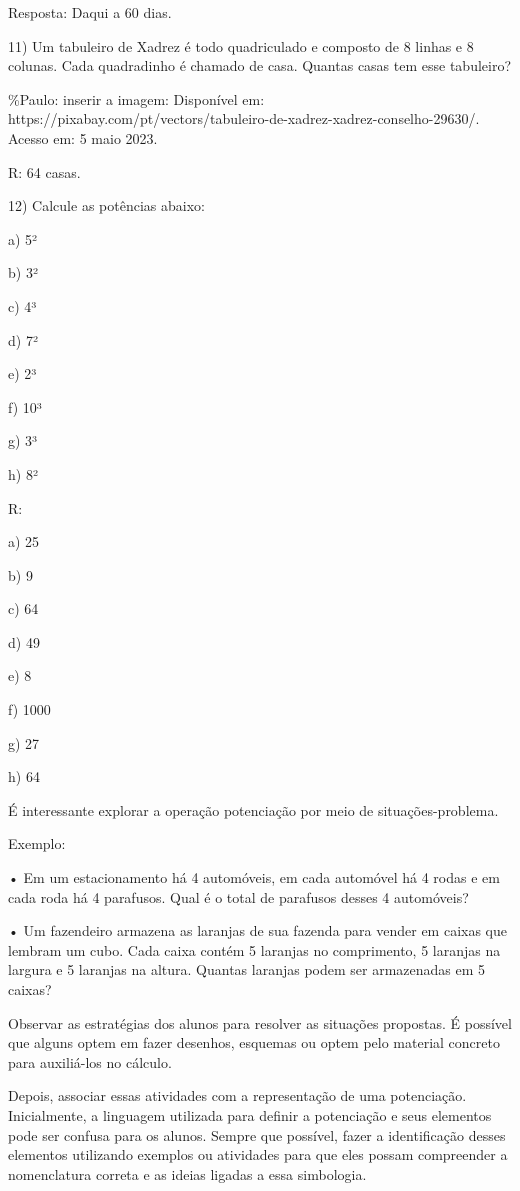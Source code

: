 Resposta: Daqui a 60 dias.

11) Um tabuleiro de Xadrez é todo quadriculado e composto de 8 linhas e
8 colunas. Cada quadradinho é chamado de casa. Quantas casas tem esse
tabuleiro?

\%Paulo: inserir a imagem: Disponível em:
https://pixabay.com/pt/vectors/tabuleiro-de-xadrez-xadrez-conselho-29630/.
Acesso em: 5 maio 2023.

R: 64 casas.

12) Calcule as potências abaixo:

a) 5²

b) 3²

c) 4³

d) 7²

e) 2³

f) 10³

g) 3³

h) 8²

R:

a) 25

b) 9

c) 64

d) 49

e) 8

f) 1000

g) 27

h) 64

É interessante explorar a operação potenciação por meio de
situações-problema.

Exemplo:

• Em um estacionamento há 4 automóveis, em cada automóvel há 4 rodas e
em cada roda há 4 parafusos. Qual é o total de parafusos desses 4
automóveis?

• Um fazendeiro armazena as laranjas de sua fazenda para vender em
caixas que lembram um cubo. Cada caixa contém 5 laranjas no comprimento,
5 laranjas na largura e 5 laranjas na altura. Quantas laranjas podem ser
armazenadas em 5 caixas?

Observar as estratégias dos alunos para resolver as situações propostas.
É possível que alguns optem em fazer desenhos, esquemas ou optem pelo
material concreto para auxiliá-los no cálculo.

Depois, associar essas atividades com a representação de uma
potenciação. Inicialmente, a linguagem utilizada para definir a
potenciação e seus elementos pode ser confusa para os alunos. Sempre que
possível, fazer a identificação desses elementos utilizando exemplos ou
atividades para que eles possam compreender a nomenclatura correta e as
ideias ligadas a essa simbologia.

